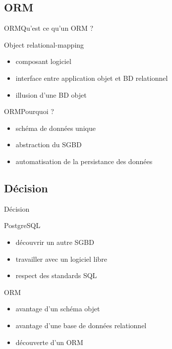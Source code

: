 \subsection{ORM}
\begin{frame}{ORM}{Qu'est ce qu'un ORM ?}
  \begin{block}{Object relational-mapping}
    \begin{itemize}
      \item composant logiciel
      \item interface entre application objet et BD relationnel
      \item illusion d'une BD objet
    \end{itemize}
  \end{block}
\end{frame}

\begin{frame}{ORM}{Pourquoi ?}
  \begin{itemize}
    \item schéma de données unique
    \item abstraction du SGBD
    \item automatisation de la persistance des données
  \end{itemize}
\end{frame}

\subsection{Décision}
\begin{frame}{Décision}
  \begin{block}{PostgreSQL}
    \begin{itemize}
      \item découvrir un autre SGBD
      \item travailler avec un logiciel libre
      \item respect des standards SQL
    \end{itemize}
  \end{block}
  \begin{block}{ORM}
    \begin{itemize}
      \item avantage d'un schéma objet
      \item avantage d'une base de données relationnel
      \item découverte d'un ORM
    \end{itemize}
  \end{block}
\end{frame}
